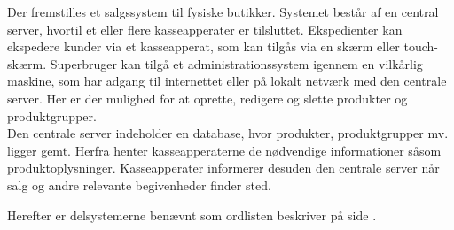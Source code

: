 Der fremstilles et salgssystem til fysiske butikker. Systemet består af en central server, hvortil et eller flere kasseapperater er tilsluttet. Ekspedienter kan ekspedere kunder via et kasseapperat, som kan tilgås via en skærm eller touch-skærm. Superbruger kan tilgå et administrationssystem igennem en vilkårlig maskine, som har adgang til internettet eller på lokalt netværk med den centrale server. Her er der mulighed for at oprette, redigere og slette produkter og produktgrupper.\\

Den centrale server indeholder en database, hvor produkter, produktgrupper mv. ligger gemt. Herfra henter kasseapperaterne de nødvendige informationer såsom produktoplysninger. Kasseapperater informerer desuden den centrale server når salg og andre relevante begivenheder finder sted.

Herefter er delsystemerne benævnt som ordlisten beskriver på side \pageref{ordliste}.